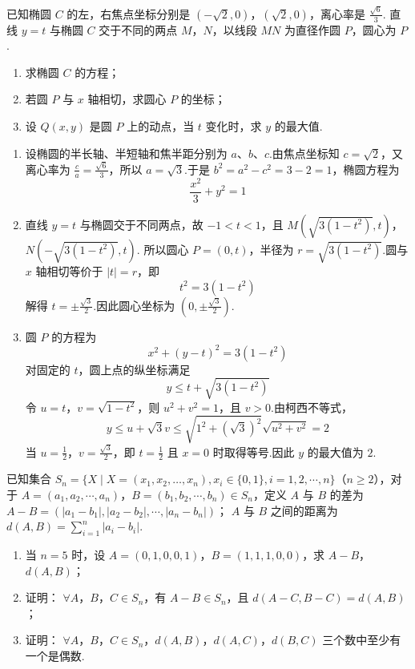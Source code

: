 \begin{problem}
已知椭圆 \(C\) 的左，右焦点坐标分别是 \((- \sqrt{2}, 0)\)，\((\sqrt{2}, 0)\)，离心率是 \(\frac{\sqrt{6}}{3}\). 直线 \(y = t\) 与椭圆 \(C\) 交于不同的两点 \(M\)，\(N\)，以线段 \(MN\) 为直径作圆 \(P\)，圆心为 \(P\).

\begin{enumerate}
\item 求椭圆 \(C\) 的方程；
\item 若圆 \(P\) 与 \(x\) 轴相切，求圆心 \(P\) 的坐标；
\item 设 \(Q(x,y)\) 是圆 \(P\) 上的动点，当 \(t\) 变化时，求 \(y\) 的最大值.
\end{enumerate}
\end{problem}

\begin{solution}
\begin{enumerate}
\item 设椭圆的半长轴、半短轴和焦半距分别为 \(a\)、\(b\)、\(c\).由焦点坐标知 \(c=\sqrt{2}\)，又离心率为 \(\frac{c}{a}=\frac{\sqrt{6}}{3}\)，所以 \(a=\sqrt{3}\).于是 \(b^2=a^2-c^2=3-2=1\)，椭圆方程为
\[
\frac{x^2}{3}+y^2=1
\]

\item 直线 \(y=t\) 与椭圆交于不同两点，故 \(-1<t<1\)，且
\(M\left(\sqrt{3(1-t^2)},t\right)\)，\(N\left(-\sqrt{3(1-t^2)},t\right)\).
所以圆心 \(P=(0,t)\)，半径为 \(r=\sqrt{3(1-t^2)}\).圆与 \(x\) 轴相切等价于 \(|t|=r\)，即
\[
t^2=3(1-t^2)
\]
解得 \(t=\pm\frac{\sqrt{3}}{2}\).因此圆心坐标为 \(\left(0,\pm\frac{\sqrt{3}}{2}\right)\).

\item 圆 \(P\) 的方程为
\[
x^2+(y-t)^2=3(1-t^2)
\]
对固定的 \(t\)，圆上点的纵坐标满足
\[
y\leqslant t+\sqrt{3(1-t^2)}
\]
令 \(u=t\)，\(v=\sqrt{1-t^2}\)，则 \(u^2+v^2=1\)，且 \(v>0\).由柯西不等式，
\[
y\leqslant u+\sqrt{3}v\leqslant\sqrt{1^2+(\sqrt{3})^2}\sqrt{u^2+v^2}=2
\]
当 \(u=\frac{1}{2}\)，\(v=\frac{\sqrt{3}}{2}\)，即 \(t=\frac{1}{2}\) 且 \(x=0\) 时取得等号.因此 \(y\) 的最大值为 \(2\).
\end{enumerate}
\end{solution}

\begin{problem}
已知集合 \( S_{n} = \{X \mid X = (x_{1}, x_{2}, \ldots, x_{n}), x_{i} \in \{0, 1\}, i = 1, 2, \cdots, n\} \)（\( n \geqslant 2 \)），对于 \( A = (a_{1}, a_{2}, \cdots, a_{n}) \)，\( B = (b_{1}, b_{2}, \cdots, b_{n}) \in S_{n} \)，定义 \(A\) 与 \(B\) 的差为 \( A - B = (|a_{1} - b_{1}|, |a_{2} - b_{2}|, \cdots, |a_{n} - b_{n}|) \)； \(A\) 与 \(B\) 之间的距离为 \( d(A, B) = \sum_{i=1}^{n} |a_{i} - b_{i}| \).

\begin{enumerate}
\item 当 \(n = 5\) 时，设 \(A = (0, 1, 0, 0, 1)\)，\(B = (1, 1, 1, 0, 0)\)，求 \(A - B\)，\(d(A, B)\)；
\item 证明： \(\forall A\)，\(B\)，\(C \in S_n\)，有 \(A - B \in S_n\)，且 \(d(A - C, B - C) = d(A, B)\)；
\item 证明： \(\forall A\)，\(B\)，\(C \in S_n\)，\(d(A, B)\)，\(d(A, C)\)，\(d(B, C)\) 三个数中至少有一个是偶数.
\end{enumerate}
\end{problem}

